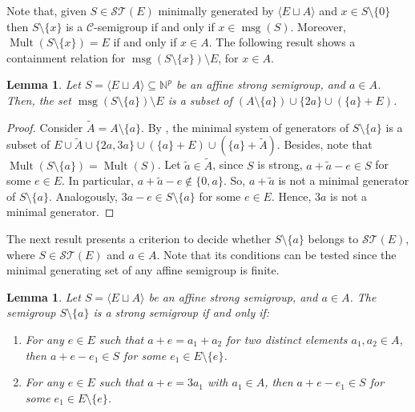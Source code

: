 \documentclass[a4paper,11pt]{article}
\newtheorem{lemma}[theorem]{Lemma}
\def\N{\mathbb{N}}
\def\msg{\operatorname{msg}}
\def\Mult{\operatorname{Mult}}
\begin{document}
{Note that, given $S \in \mathcal{ST}(E)$ minimally generated by $\langle E \sqcup A \rangle$ and $x \in S \setminus \{0\}$ then $S \setminus \{x\}$ is a $\mathcal{C}$-semigroup if and only if $x \in \msg(S)$. Moreover, $\Mult(S \setminus \{x\} )=E$ if and only if $x \in A$. The following result shows a containment relation for $\msg(S \setminus \{x\}) \setminus E$, for $x \in A$.

\begin{lemma}\label{SistMin_S_menos_a}
Let $S=\langle E\sqcup A\rangle\subseteq \N^p$ be an affine strong semigroup, and $a\in A$. Then, the set $\msg (S\setminus\{a\})\setminus E$ is a subset of $(A\setminus\{a\})\cup \{2a\} \cup (\{a\}+E)$.
\end{lemma}

\begin{proof}
Consider $\tilde{A}=A\setminus\{a\}$. By \cite[Lemma 3]{Csemigroup}, the minimal system of generators of $S\setminus\{a\}$ is a subset of $E\cup \tilde{A}\cup \{2a,3a\} \cup \left(\{a\}+E\right)\cup (\{a\}+\tilde{A})$. Besides, note that $\Mult (S\setminus\{a\})=\Mult(S)$. Let
$\tilde{a}\in \tilde{A}$, since $S$ is strong, $a+\tilde{a}-e\in S$ for some $e \in E$. In particular, $a+\tilde{a}-e\notin\{0, a\}$. So, $a+\tilde{a}$ is not a minimal generator of $S\setminus\{a\}$. Analogously, $3a-e\in S\setminus\{a\}$ for some $e\in E$. Hence, $3a$ is not a minimal generator.
\end{proof}

The next result presents a criterion to decide whether $S\setminus\{a\}$ belongs to $\mathcal{ST}(E)$, where $S \in \mathcal{ST}(E)$ and $a \in A$. Note that its conditions can be tested since the minimal generating set of any affine semigroup is finite.

\begin{lemma}\label{SmenosXstrong}
Let $S=\langle E\sqcup A\rangle$ be an affine strong semigroup, and $a\in A$. The semigroup $S\setminus \{a\}$ is a strong semigroup if and only if:
\begin{enumerate}[label={(C\arabic*)}]
\item \label{cond1} For any $e\in E$ such that $a+e= a_1+a_2$ for two distinct elements $a_1,a_2\in A$, then $a+e-e_1\in S$ for some $e_1\in E\setminus\{e\}$.

\item \label{cond2} For any $e\in E$ such that $a+e= 3a_1$ with $a_1\in A$, then $a+e-e_1\in S$ for some $e_1\in E\setminus\{e\}$.
\end{enumerate}
\end{lemma}

}
\end{document}
